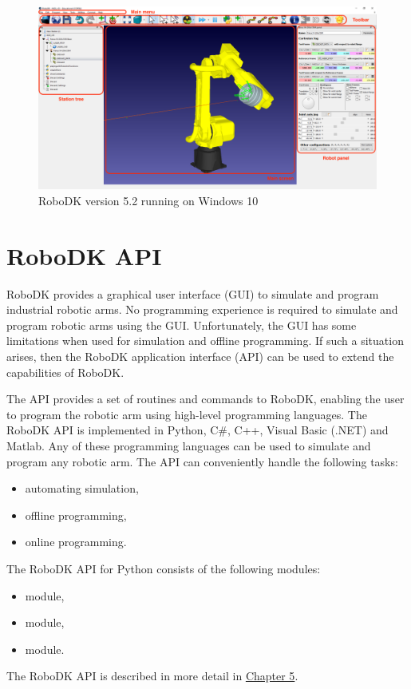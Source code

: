 \begin{figure}[h]
    \centering
    \includegraphics[width=0.9\linewidth]{img/robodk_interface_v_2.png}
    \caption{RoboDK version 5.2 running on Windows 10}
    \label{fig:robodkinterface}
\end{figure}

\section{RoboDK API}

RoboDK provides a graphical user interface (GUI) to simulate and program industrial robotic arms. No programming experience is required to simulate and program robotic arms using the GUI. Unfortunately, the GUI has some limitations when used for simulation and offline programming. If such a situation arises, then the RoboDK application interface (API) can be used to extend the capabilities of RoboDK.

The API provides a set of routines and commands to RoboDK, enabling the user to program the robotic arm using high-level programming languages. The RoboDK API is implemented in Python, C\#, C++, Visual Basic (.NET) and Matlab. Any of these programming languages can be used to simulate and program any robotic arm. The API can conveniently handle the following tasks:

\begin{itemize}
    \item automating simulation,
    \item offline programming,
    \item online programming.

\end{itemize}

The RoboDK API for Python consists of the following modules:


\begin{itemize}
    \item {} module, 
    \item {} module, 
    \item {} module.
\end{itemize}
The RoboDK API is described in more detail in \hyperref[chap:implementation]{Chapter 5}.

